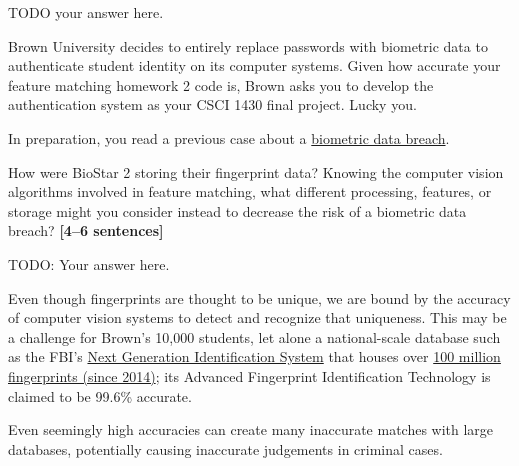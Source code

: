 \documentclass{csci1430}
\begin{document}
\begin{answer}[height=14]
TODO your answer here.
\end{answer}
    

\pagebreak

\begin{question}[points=7,drawbox=false] 
Brown University decides to entirely replace passwords with biometric data to authenticate student identity on its computer systems. Given how accurate your feature matching homework 2 code is, Brown asks you to develop the authentication system as your CSCI 1430 final project. Lucky you.

In preparation, you read a previous case about a \href{https://www.vpnmentor.com/blog/report-biostar2-leak/}{biometric data breach}.
\end{question}

\begin{subquestion}[points=3]
How were BioStar 2 storing their fingerprint data? Knowing the computer vision algorithms involved in feature matching, what different processing, features, or storage might you consider instead to decrease the risk of a biometric data breach? \textbf{[4--6 sentences]}
\end{subquestion}

\begin{answer}[height=16]
TODO: Your answer here.
\end{answer}

\pagebreak

\begin{subquestion}[points=4,drawbox=false]
Even though fingerprints are thought to be unique, we are bound by the accuracy of computer vision systems to detect and recognize that uniqueness.
This may be a challenge for Brown's 10,000 students, let alone a national-scale database such as the FBI's \href{https://www.fbi.gov/services/cjis/fingerprints-and-other-biometrics/ngi}{Next Generation Identification System} that houses over \href{https://en.wikipedia.org/wiki/Next_Generation_Identification}{100 million fingerprints (since 2014)}; its Advanced Fingerprint Identification Technology is claimed to be 99.6\% accurate.

Even seemingly high accuracies can create many inaccurate matches with large databases, potentially causing inaccurate judgements in criminal cases.
\end{subquestion}
\end{document}
